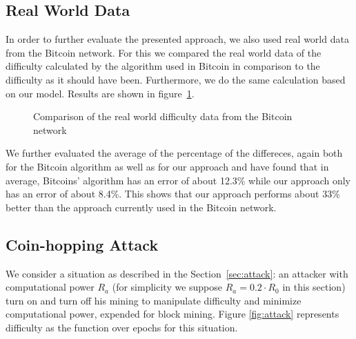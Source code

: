 \documentclass[]{llncs}
\newcommand{\AttackName}{Coin-hopping Attack}
\begin{document}
\subsection{Real World Data}

In order to further evaluate the presented approach, we also used real world data from the Bitcoin network. For this we compared the real world data of the difficulty calculated by the algorithm used in Bitcoin in comparison to the difficulty as it should have been. Furthermore, we do the same calculation based on our model. Results are shown in figure~\ref{fig:real_world_difficulty}.

\begin{figure}[h]
\caption{Comparison of the real world difficulty data from the Bitcoin network}
\label{fig:real_world_difficulty}
\end{figure}

We further evaluated the average of the percentage of the differeces, again both for the Bitcoin algorithm as well as for our approach and have found that in average, Bitcoins' algorithm has an error of about 12.3\% while our approach only has an error of about 8.4\%. This shows that our approach performs about 33\% better than the approach currently used in the Bitcoin network.

\subsection{\AttackName}

We consider a situation as described in the Section~\ref{sec:attack}: an attacker with computational power \(R_a\) (for simplicity we suppose \(R_a=0.2 \cdot R_0 \) in this section) turn on and turn off his mining to manipulate difficulty and minimize computational power, expended for block mining.
Figure \ref{fig:attack} represents difficulty as the function over epochs for this situation.
\end{document}

